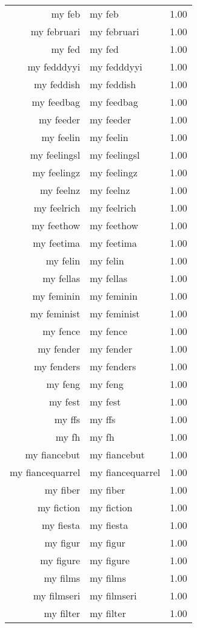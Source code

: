 \begin{table}[ht]
\begin{tabular}{rlr}
  my feb & my feb & 1.00 \\ 
  my februari & my februari & 1.00 \\ 
  my fed & my fed & 1.00 \\ 
  my fedddyyi & my fedddyyi & 1.00 \\ 
  my feddish & my feddish & 1.00 \\ 
  my feedbag & my feedbag & 1.00 \\ 
  my feeder & my feeder & 1.00 \\ 
  my feelin & my feelin & 1.00 \\ 
  my feelingsl & my feelingsl & 1.00 \\ 
  my feelingz & my feelingz & 1.00 \\ 
  my feelnz & my feelnz & 1.00 \\ 
  my feelrich & my feelrich & 1.00 \\ 
  my feethow & my feethow & 1.00 \\ 
  my feetima & my feetima & 1.00 \\ 
  my felin & my felin & 1.00 \\ 
  my fellas & my fellas & 1.00 \\ 
  my feminin & my feminin & 1.00 \\ 
  my feminist & my feminist & 1.00 \\ 
  my fence & my fence & 1.00 \\ 
  my fender & my fender & 1.00 \\ 
  my fenders & my fenders & 1.00 \\ 
  my feng & my feng & 1.00 \\ 
  my fest & my fest & 1.00 \\ 
  my ffs & my ffs & 1.00 \\ 
  my fh & my fh & 1.00 \\ 
  my fiancebut & my fiancebut & 1.00 \\ 
  my fiancequarrel & my fiancequarrel & 1.00 \\ 
  my fiber & my fiber & 1.00 \\ 
  my fiction & my fiction & 1.00 \\ 
  my fiesta & my fiesta & 1.00 \\ 
  my figur & my figur & 1.00 \\ 
  my figure & my figure & 1.00 \\ 
  my films & my films & 1.00 \\ 
  my filmseri & my filmseri & 1.00 \\ 
  my filter & my filter & 1.00 \\ 

\end{tabular}
\end{table}
